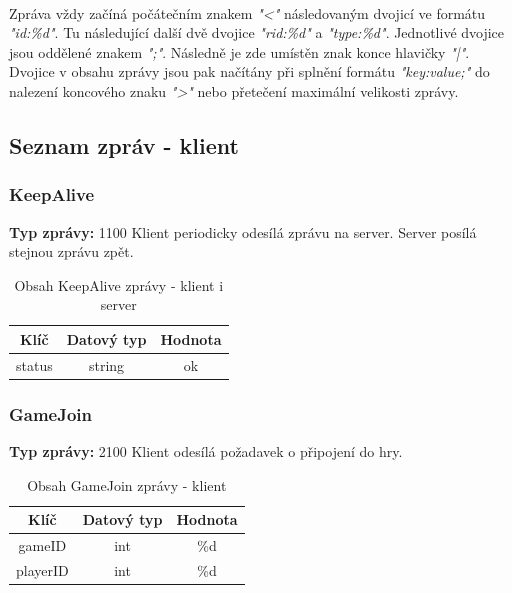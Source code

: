\documentclass[12pt, a4paper]{article}
\begin{document}
\paragraph{}
Zpráva vždy začíná počátečním znakem \textit{"<"} následovaným dvojicí ve formátu \textit{"id:\%d"}. Tu následující
další dvě dvojice \textit{"rid:\%d"} a \textit{"type:\%d"}. Jednotlivé dvojice jsou oddělené znakem \textit{";"}.
Následně je zde umístěn znak konce hlavičky \textit{"|"}. Dvojice v obsahu zprávy jsou pak načítány při splnění
formátu \textit{"key:value;"} do nalezení koncového znaku \textit{">"} nebo přetečení maximální velikosti zprávy.


\newpage
\subsection{Seznam zpráv - klient}
\subsubsection{KeepAlive}
\textbf{Typ zprávy: } 1100 \newline
Klient periodicky odesílá zprávu na server. Server posílá stejnou zprávu zpět. \newline

    \begin{table}[H]
        \centering
        \begin{tabular}{|c|c|c|}
            \hline
            Klíč & Datový typ & Hodnota \\
            \hline
            \hline
            status & string & ok \\
            \hline
        \end{tabular}
        \caption{Obsah KeepAlive zprávy - klient i server}
    \end{table}

\subsubsection{GameJoin}
\textbf{Typ zprávy: } 2100 \newline
Klient odesílá požadavek o připojení do hry. \newline

    \begin{table}[H]
        \centering
        \begin{tabular}{|c|c|c|}
            \hline
            Klíč & Datový typ & Hodnota \\
            \hline
            \hline
            gameID & int & \%d \\
            \hline
            playerID & int & \%d \\
            \hline
        \end{tabular}
        \caption{Obsah GameJoin zprávy - klient}
    \end{table}
\end{document}
